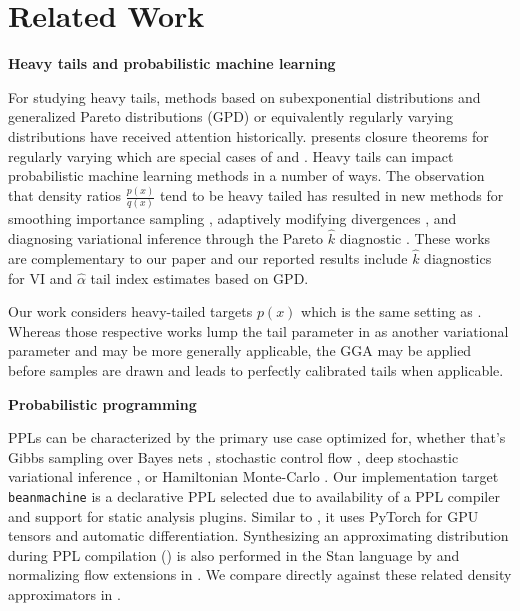 \documentclass[../thesis.tex]{subfiles}
\begin{document}
\section{Related Work}

\textbf{Heavy tails and probabilistic machine learning}

For studying heavy tails, methods based on subexponential distributions
\citep{goldie1998subexponential} and generalized Pareto distributions (GPD) or
equivalently regularly varying distributions \citep{tajvidi2003confidence}
have received attention historically. \citet{mikosch} presents closure theorems for regularly varying which are special cases of  and .
Heavy tails can impact probabilistic machine learning methods in a number of ways.
The observation that density ratios $\frac{p(x)}{q(x)}$ tend to be heavy tailed
has resulted in new methods for smoothing importance sampling \citep{vehtari2015pareto},
adaptively modifying divergences \citep{wang2018variational}, and
diagnosing variational inference through the Pareto $\hat{k}$ diagnostic \citep{yao2018yes}.
These works are complementary to our paper and our reported results include $\hat{k}$
diagnostics for VI and $\hat\alpha$ tail index estimates based on GPD.

Our work considers heavy-tailed targets $p(x)$ which is the same setting as
\citet{jaini2020tails,ftvi}. Whereas those respective works
lump the tail parameter in as another variational parameter and may be more generally applicable, the GGA may be applied before samples are drawn and leads to perfectly calibrated tails when applicable.

\textbf{Probabilistic programming}

PPLs can be characterized by the primary use case optimized for, whether that's
Gibbs sampling over Bayes nets \citep{spiegelhalter1996bugs,de2017programming},
stochastic control flow \citep{goodman2012church,wingate2011lightweight},
deep stochastic variational inference \citep{tran2018simple,bingham2019pyro}, or
Hamiltonian Monte-Carlo \citep{carpenter2017stan,xu2020advancedhmc}. Our implementation target
\texttt{beanmachine} \citep{tehrani2020bean} is a declarative PPL selected
due to availability of a PPL compiler and support for static analysis plugins.
Similar to \citet{bingham2019pyro,siddharth2017learning}, it uses PyTorch \citep{paszke2019pytorch} for GPU tensors and automatic differentiation.
Synthesizing an approximating distribution during PPL compilation () is
also performed in the Stan language by \citet{kucukelbir2017automatic} and normalizing
flow extensions in \citet{webb2019aml}. We compare directly against these related density approximators in .
\end{document}
